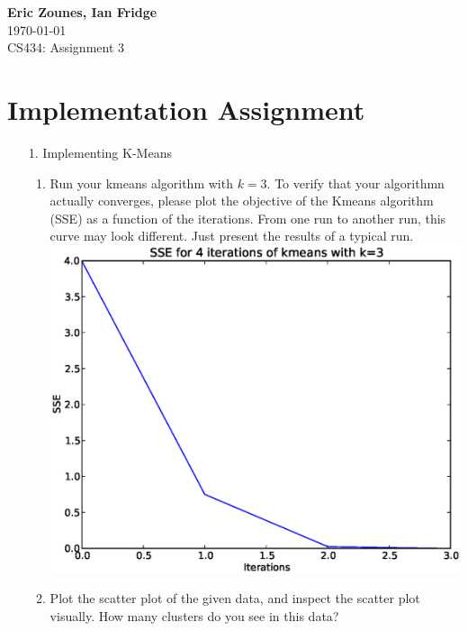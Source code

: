 \documentclass[12pt,letterpaper]{article}
\begin{document}
\setcounter{subsection}{2} 
\begin{flushright}
\end{flushright}
\begin{flushleft}
\textbf{Eric Zounes, Ian Fridge} \\
\today \\ 
CS434: Assignment 3
\end{flushleft}
\section[1]{Implementation Assignment} 
\begin{enumerate} 
	\item[1.] Implementing K-Means 	
	\begin{enumerate} 
		\item Run your kmeans algorithm with $k = 3$. To verify that your algorithmn actually converges, please plot the objective of the Kmeans algorithm (SSE) as a function of the iterations. From one run to another run, this curve may look different. Just present the results of a typical run. \\
		\includegraphics[width=6in]{SSEk3.eps} \\[15mm]
		\item Plot the scatter plot of the given data, and inspect the scatter plot visually. How many clusters do you see in this data? \\

\end{enumerate}
\end{enumerate}
\end{document}
